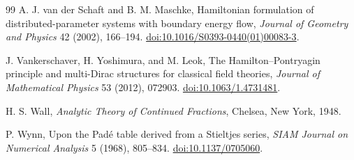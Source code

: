 \documentclass[11pt,a4paper]{article}
\begin{document}
\begin{thebibliography}{99}
A. J. van der Schaft and B. M. Maschke,
\newblock Hamiltonian formulation of distributed-parameter systems with
boundary energy flow,
\newblock \emph{Journal of Geometry and Physics} 42 (2002), 166--194.
\newblock \href{https://doi.org/10.1016/S0393-0440(01)00083-3}
{doi:10.1016/S0393-0440(01)00083-3}.

J. Vankerschaver, H. Yoshimura, and M. Leok,
\newblock The Hamilton--Pontryagin principle and multi-Dirac structures for
classical field theories,
\newblock \emph{Journal of Mathematical Physics} 53 (2012), 072903.
\newblock \href{https://doi.org/10.1063/1.4731481}
{doi:10.1063/1.4731481}.

H. S. Wall,
\newblock \emph{Analytic Theory of Continued Fractions},
\newblock Chelsea, New York, 1948.

P. Wynn,
\newblock Upon the Pad\'e table derived from a Stieltjes series,
\newblock \emph{SIAM Journal on Numerical Analysis} 5 (1968), 805--834.
\newblock \href{https://doi.org/10.1137/0705060}
{doi:10.1137/0705060}.

\end{thebibliography}
\end{document}
